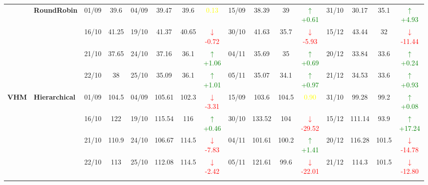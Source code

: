 \documentclass{ieeeaccess}
\begin{document}
{\begin{longtable}{llcc|cccc|cccc|cccc}
& \textbf{RoundRobin}
& 01/09 & 39.6 & 04/09 & 39.47 & 39.6 & \textcolor{yellow}{0.13} & 15/09 & 38.39 & 39 & \textcolor{green}{\(\uparrow\)+0.61} & 31/10 & 30.17 & 35.1 & \textcolor{green}{\(\uparrow\)+4.93} \\

&
& 16/10 & 41.25 & 19/10 & 41.37 & 40.65 & \textcolor{red}{\(\downarrow\)-0.72} & 30/10 & 41.63 & 35.7 & \textcolor{red}{\(\downarrow\)-5.93} & 15/12 & 43.44 & 32 & \textcolor{red}{\(\downarrow\)-11.44} \\

&
& 21/10 & 37.65 & 24/10 & 37.16 & 36.1 & \textcolor{green}{\(\uparrow\)+1.06} & 04/11 & 35.69 & 35 & \textcolor{green}{\(\uparrow\)+0.69} & 20/12 & 33.84 & 33.6 & \textcolor{green}{\(\uparrow\)+0.24} \\

&
& 22/10 & 38 & 25/10 & 35.09 & 36.1 & \textcolor{green}{\(\uparrow\)+1.01} & 05/11 & 35.07 & 34.1 & \textcolor{green}{\(\uparrow\)+0.97} & 21/12 & 34.53 & 33.6 & \textcolor{green}{\(\uparrow\)+0.93} \\
\midrule




\multirow{12}{*}{\textbf{VHM}} 
& \textbf{Hierarchical}
& 01/09 & 104.5 & 04/09 & 105.61 & 102.3 & \textcolor{red}{\(\downarrow\)-3.31} & 15/09 & 103.6 & 104.5 & \textcolor{yellow}{0.90} & 31/10 & 99.28 & 99.2 & \textcolor{green}{\(\uparrow\)+0.08} \\

&
& 16/10 & 122 & 19/10 & 115.54 & 116 & \textcolor{green}{\(\uparrow\)+0.46} & 30/10 & 133.52 & 104 & \textcolor{red}{\(\downarrow\)-29.52} & 15/12 & 111.14 & 93.9 & \textcolor{green}{\(\uparrow\)+17.24} \\

&
& 21/10 & 110.9 & 24/10 & 106.67 & 114.5 & \textcolor{red}{\(\downarrow\)-7.83} & 04/11 & 101.61 & 100.2 & \textcolor{green}{\(\uparrow\)+1.41} & 20/12 & 116.28 & 101.5 & \textcolor{red}{\(\downarrow\)-14.78} \\

&
& 22/10 & 113 & 25/10 & 112.08 & 114.5 & \textcolor{red}{\(\downarrow\)-2.42} & 05/11 & 121.61 & 99.6 & \textcolor{red}{\(\downarrow\)-22.01} & 21/12 & 114.3 & 101.5 & \textcolor{red}{\(\downarrow\)-12.80} \\
\cmidrule(lr){2-16}



\end{longtable}}
\end{document}
